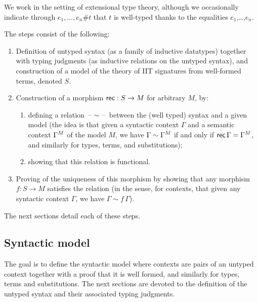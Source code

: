 We work in the setting of extensional type theory, although we occasionally indicate through $e_1,\dots,e_n \#
t$ that $t$ is well-typed thanks to the equalities $e_1$,\dots,$e_n$.

The steps consist of the following:
\begin{enumerate}
\item Definition of untyped syntax (as a family of inductive datatypes) together
  with typing judgments (as inductive relations on the untyped
  syntax), and construction of a model of the theory of IIT
  signatures from well-formed terms, denoted $S$.
\item Construction of a morphism $\mathsf{rec}:S\to M$ for arbitrary $M$, by:
  \begin{enumerate}
  \item defining a relation $\mathord{\hspace{1pt}\text{--}\hspace{1pt}} \sim \mathord{\hspace{1pt}\text{--}\hspace{1pt}}$ between the (well typed) syntax and a given
    model (the idea is that given a syntactic context $\Gamma$ and a semantic
    context ${\Gamma}^M$ of the model $M$, we have $\Gamma \sim
    {\Gamma}^M$ if and only if $\mathsf{rec}\,\Gamma = {\Gamma}^M$, and
    similarly for types, terms, and substitutions);
  \item showing that this relation is functional.
    \end{enumerate}
  \item Proving of the uniqueness of this morphism by showing that
    any morphism $f:S\to M$ satisfies the relation
    (in the sense, for contexts, that given any syntactic context $\Gamma$, we
    have $\Gamma\sim f\,\Gamma$).
\end{enumerate}
The next sections detail each of these steps.
\subsection{Syntactic model}

The goal is to define the syntactic model where contexts are pairs of an untyped 
context together with a proof that it is well formed, and similarly for types,
terms and substitutions.
The next sections are devoted to the definition of the untyped syntax and their associated
typing judgments.

